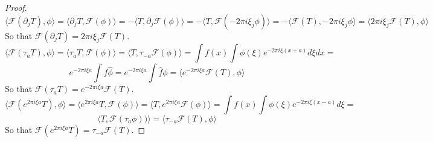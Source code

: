 \documentclass[12pt]{article}
\newenvironment{exercise}[2][Exercise]{\begin{trivlist}
\item[\hskip \labelsep {\bfseries #1}\hskip \labelsep {\bfseries #2.}]}{\end{trivlist}}
\begin{document}
\begin{proof}
  $$\langle \mathcal{F}(\partial_j T), \phi \rangle = \langle \partial_j T, \mathcal{F}(\phi) \rangle = - \langle T, \partial_j \mathcal{F}(\phi) \rangle = - \langle T, \mathcal{F}(-2 \pi i \xi_j \phi) \rangle = - \langle \mathcal{F}(T), -2 \pi i \xi_j \phi \rangle = \langle 2 \pi i \xi_j \mathcal{F}(T), \phi \rangle$$
  So that $\mathcal{F}(\partial_j T) = 2 \pi i \xi_j \mathcal{F}(T)$.\\

  $$\langle \mathcal{F}(\tau_a T), \phi \rangle = \langle \tau_a T, \mathcal{F}(\phi) \rangle = \langle T, \tau_{-a} \mathcal{F}(\phi) \rangle = \int f(x) \int \phi(\xi) e^{-2 \pi i \xi (x+a)} d\xi dx =$$ $$e^{-2 \pi i \xi a} \int f \hat{\phi} = e^{-2 \pi i \xi a} \int \hat{f} \phi = \langle e^{-2 \pi i \xi a} \mathcal{F}(T), \phi \rangle$$
  So that $\mathcal{F}(\tau_a T) = e^{-2 \pi i \xi a} \mathcal{F}(T)$.\\

  $$\langle \mathcal{F}(e^{2 \pi i \xi a} T), \phi \rangle = \langle e^{2 \pi i \xi a} T, \mathcal{F}(\phi) \rangle = \langle T, e^{2 \pi i \xi a} \mathcal{F}(\phi) \rangle = \int f(x) \int \phi(\xi) e^{-2 \pi i \xi (x-a)} d\xi =$$ $$\langle T, \mathcal{F}(\tau_a \phi)) \rangle = \langle \tau_{-a} \mathcal{F}(T), \phi \rangle$$
  So that $\mathcal{F}(e^{2 \pi i \xi a} T) = \tau_{-a} \mathcal{F}(T)$.
\end{proof}

\begin{exercise}{3}
\end{exercise}
\end{document}
